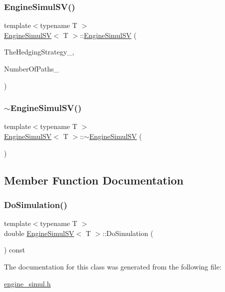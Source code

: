 \subsubsection{\texorpdfstring{Engine\+Simul\+S\+V()}{EngineSimulSV()}}
{\footnotesize\ttfamily template$<$typename T $>$ \\
\hyperlink{classEngineSimulSV}{Engine\+Simul\+SV}$<$ T $>$\+::\hyperlink{classEngineSimulSV}{Engine\+Simul\+SV} (\begin{DoxyParamCaption}\item[{shared\+\_\+ptr$<$ \hyperlink{classHedgingStrategySV}{Hedging\+Strategy\+SV}$<$ T $>$$>$}]{The\+Hedging\+Strategy\+\_\+,  }\item[{unsigned long}]{Number\+Of\+Paths\+\_\+ }\end{DoxyParamCaption})}

\hypertarget{classEngineSimulSV_a3d2d099c94f7ff0a717cc85769413f72}{}\label{classEngineSimulSV_a3d2d099c94f7ff0a717cc85769413f72} 
\subsubsection{\texorpdfstring{$\sim$\+Engine\+Simul\+S\+V()}{~EngineSimulSV()}}
{\footnotesize\ttfamily template$<$typename T $>$ \\
\hyperlink{classEngineSimulSV}{Engine\+Simul\+SV}$<$ T $>$\+::$\sim$\hyperlink{classEngineSimulSV}{Engine\+Simul\+SV} (\begin{DoxyParamCaption}{ }\end{DoxyParamCaption})\hspace{0.3cm}{\ttfamily [inline]}}



\subsection{Member Function Documentation}
\hypertarget{classEngineSimulSV_a1883c6f71ba18603fc28b03415c8c0dd}{}\label{classEngineSimulSV_a1883c6f71ba18603fc28b03415c8c0dd} 
\subsubsection{\texorpdfstring{Do\+Simulation()}{DoSimulation()}}
{\footnotesize\ttfamily template$<$typename T $>$ \\
double \hyperlink{classEngineSimulSV}{Engine\+Simul\+SV}$<$ T $>$\+::Do\+Simulation (\begin{DoxyParamCaption}{ }\end{DoxyParamCaption}) const}



The documentation for this class was generated from the following file\+:\begin{DoxyCompactItemize}
\item 
\hyperlink{engine__simul_8h}{engine\+\_\+simul.\+h}\end{DoxyCompactItemize}
